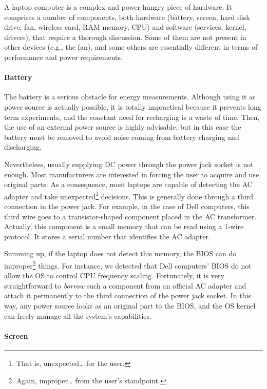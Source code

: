 \documentclass[twoside,nohyper]{tufte-book}
\theoremstyle{definition}
\theoremstyle{definition}
\theoremstyle{definition}
\theoremstyle{remark}
\begin{document}
A laptop computer is a complex and power-hungry piece of hardware. It
comprises a number of components, both hardware (battery, screen, hard
disk drive, fan, wireless card, RAM memory, CPU) and software (services,
kernel, drivers), that require a thorough discussion. Some of them are
not present in other devices (e.g., the fan), and some others are
essentially different in terms of performance and power requirements.

\hypertarget{battery}{%
\paragraph{Battery}\label{battery}}

The battery is a serious obstacle for energy measurements. Although
using it as power source is actually possible, it is totally impractical
because it prevents long term experiments, and the constant need for
recharging is a waste of time. Then, the use of an external power source
is highly advisable, but in this case the battery must be removed to
avoid noise coming from battery charging and discharging.

Nevertheless, usually supplying DC power through the power jack socket
is not enough. Most manufacturers are interested in forcing the user to
acquire and use original parts. As a consequence, most laptops are
capable of detecting the AC adapter and take unexpected\footnote{That
  is, unexpected\ldots{} for the user.} decisions. This is generally
done through a third connection in the power jack. For example, in the
case of Dell computers, this third wire goes to a transistor-shaped
component placed in the AC transformer. Actually, this component is a
small memory that can be read using a 1-wire protocol. It stores a
serial number that identifies the AC adapter.

Summing up, if the laptop does not detect this memory, the BIOS can do
improper\footnote{Again, improper\ldots{} from the user's standpoint.}
things. For instance, we detected that Dell computers' BIOS do not allow
the OS to control CPU frequency scaling. Fortunately, it is very
straightforward to \emph{borrow} such a component from an official AC
adapter and attach it permanently to the third connection of the power
jack socket. In this way, any power source looks as an original part to
the BIOS, and the OS kernel can freely manage all the system's
capabilities.

\hypertarget{screen}{%
\paragraph{Screen}\label{screen}}
\end{document}
